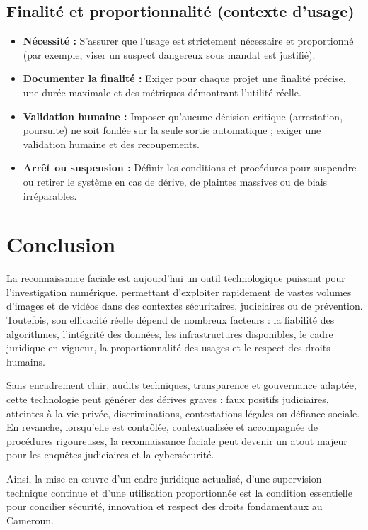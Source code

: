 \documentclass[11pt,a4paper]{article}
\begin{document}
	\subsection{Finalité et proportionnalité (contexte d’usage)}
	\begin{itemize}
		\item \textbf{Nécessité :} S’assurer que l’usage est strictement nécessaire et proportionné (par exemple, viser un suspect dangereux sous mandat est justifié).
		\item \textbf{Documenter la finalité :} Exiger pour chaque projet une finalité précise, une durée maximale et des métriques démontrant l’utilité réelle.
		\item \textbf{Validation humaine :} Imposer qu’aucune décision critique (arrestation, poursuite) ne soit fondée sur la seule sortie automatique ; exiger une validation humaine et des recoupements.
		\item \textbf{Arrêt ou suspension :} Définir les conditions et procédures pour suspendre ou retirer le système en cas de dérive, de plaintes massives ou de biais irréparables.
	\end{itemize}
	
	\newpage
	
	\section*{\Huge Conclusion}
	\vspace{0.5cm}
	La reconnaissance faciale est aujourd’hui un outil technologique puissant pour l’investigation numérique, permettant d’exploiter rapidement de vastes volumes d’images et de vidéos dans des contextes sécuritaires, judiciaires ou de prévention. Toutefois, son efficacité réelle dépend de nombreux facteurs : la fiabilité des algorithmes, l’intégrité des données, les infrastructures disponibles, le cadre juridique en vigueur, la proportionnalité des usages et le respect des droits humains.
	
	Sans encadrement clair, audits techniques, transparence et gouvernance adaptée, cette technologie peut générer des dérives graves : faux positifs judiciaires, atteintes à la vie privée, discriminations, contestations légales ou défiance sociale. En revanche, lorsqu’elle est contrôlée, contextualisée et accompagnée de procédures rigoureuses, la reconnaissance faciale peut devenir un atout majeur pour les enquêtes judiciaires et la cybersécurité.
	
	Ainsi, la mise en œuvre d’un cadre juridique actualisé, d’une supervision technique continue et d’une utilisation proportionnée est la condition essentielle pour concilier sécurité, innovation et respect des droits fondamentaux au Cameroun.
	
\end{document}
